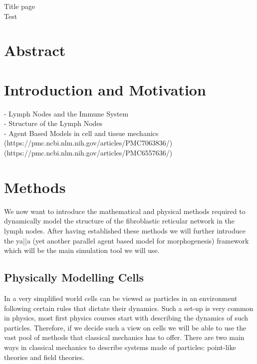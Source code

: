 \documentclass[11pt]{article}
\begin{document}
\thispagestyle{empty} %

Title page \\
Test

\newpage

\setcounter{page}{1} %

\tableofcontents

\newpage

\section*{Abstract}

\newpage

\section{Introduction and Motivation}

- Lymph Nodes and the Immune System \\
- Structure of the Lymph Nodes \\

- Agent Based Models in cell and tissue mechanics \\

(https://pmc.ncbi.nlm.nih.gov/articles/PMC7063836/)
(https://pmc.ncbi.nlm.nih.gov/articles/PMC6557636/)

\newpage

\section{Methods}

We now want to introduce the mathematical and physical methods required to dynamically model the structure of the fibroblastic reticular network in the lymph nodes. After having established these methods we will further introduce the ya||a (yet another parallel agent based model for morphogenesis) framework which will be the main simulation tool we will use. \par

\subsection{Physically Modelling Cells}

In a very simplified world cells can be viewed as particles in an environment following certain rules that dictate their dynamics. Such a set-up is very common in physics, most first physics courses start with describing the dynamics of such particles. Therefore, if we decide such a view on cells we will be able to use the vast pool of methods that classical mechanics has to offer. There are two main ways in classical mechanics to describe systems made of particles: point-like theories and field theories.
\end{document}
